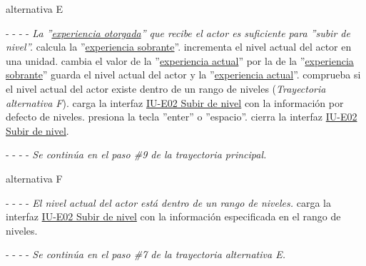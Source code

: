\begin{UCtrayectoria}{alternativa E}
    \item[- -] - - {\em La ''\hyperref[table:METerminosExperiencia1]{experiencia otorgada}'' que recibe el actor es suficiente para ''subir de nivel''.}
    \sistema calcula la ''\hyperref[table:METerminosExperiencia2]{experiencia sobrante}''.
    \sistema incrementa el nivel actual del actor en una unidad.
    \sistema cambia el valor de la ''\hyperref[table:METerminosExperiencia1]{experiencia actual}'' por la de la ''\hyperref[table:METerminosExperiencia1]{experiencia sobrante}''
    \sistema guarda el nivel actual del actor y la ''\hyperref[table:METerminosExperiencia1]{experiencia actual}''.
    \sistema comprueba si el nivel actual del actor existe dentro de un rango de niveles ({\it Trayectoria alternativa F}).
    \sistema carga la interfaz \hyperref[IUE02]{IU-E02 Subir de nivel} con la información por defecto de niveles.
    \actor presiona la tecla ''enter'' o ''espacio''.
    \sistema cierra la interfaz \hyperref[IUE02]{IU-E02 Subir de nivel}.
    \item[- -] - - {\em Se continúa en el paso \#9 de la trayectoria principal.}
\end{UCtrayectoria}


\begin{UCtrayectoria}{alternativa F}
    \item[- -] - - {\em El nivel actual del actor está dentro de un rango de niveles.}
    \sistema carga la interfaz \hyperref[IUE02]{IU-E02 Subir de nivel}  con la información especificada en el rango de niveles.
    \item[- -] - - {\em Se continúa en el paso \#7 de la trayectoria alternativa E.}
\end{UCtrayectoria}

\vfill\clearpage
